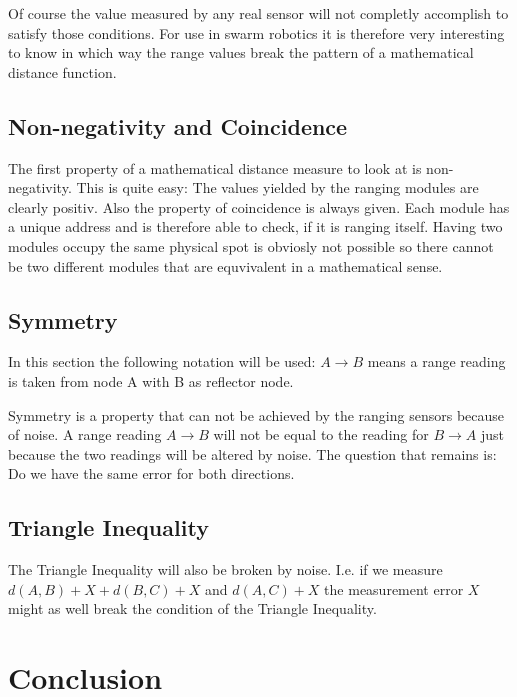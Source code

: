 Of course the value measured by any real sensor will not completly accomplish to satisfy those conditions.
For use in swarm robotics it is therefore very interesting to know in which way the range values break the pattern of a mathematical distance function.

\subsection{Non-negativity and Coincidence}

The first property of a mathematical distance measure to look at is non-negativity. This is quite easy: The values yielded by the ranging modules are clearly positiv.
Also the property of coincidence is always given.
Each module has a unique address and is therefore able to check, if it is ranging itself.
Having two modules occupy the same physical spot is obviosly not possible so there cannot be two different modules that are equvivalent in a mathematical sense.

\subsection{Symmetry}

In this section the following notation will be used: $A \rightarrow B$ means a range reading is taken from node A with B as reflector node.

Symmetry is a property that can not be achieved by the ranging sensors because of noise. 
A range reading $A \rightarrow B$ will not be equal to the reading for $B \rightarrow A$ just because the two readings will be altered by noise.
The question that remains is: Do we have the same error for both directions.



\subsection{Triangle Inequality}
The Triangle Inequality will also be broken by noise.
I.e. if we measure $d(A,B) + X + d(B,C) + X$ and $d(A, C) + X$ the measurement error $X$ might as well break the condition of the Triangle Inequality.


\section{Conclusion}

